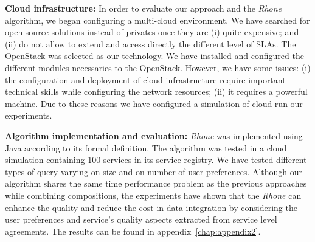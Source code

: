\bigskip
\noindent \textbf{Cloud infrastructure:}
In order to evaluate our approach and the \textit{Rhone} algorithm, we began configuring a multi-cloud environment. We have searched for open source solutions instead of privates once they are (i) quite expensive; and (ii) do not allow to extend and access directly the different level of SLAs. The OpenStack was selected as our technology. We have installed and configured the different modules necessaries to the OpenStack. However, we have some issues: (i) the configuration and deployment of cloud infrastructure require important technical skills while configuring the network resources; (ii) it requires a powerful machine. Due to these reasons we have configured a simulation of cloud run our experiments.


\bigskip
\noindent \textbf{Algorithm implementation and evaluation:}
\textit{Rhone} was implemented using Java according to its formal definition. The algorithm was tested in a cloud simulation containing 100 services in its service registry. We have tested different types of query varying on size and on number of user preferences. Although our algorithm shares the same time performance problem as the previous approaches while combining compositions, the experiments have shown that the \textit{Rhone} can enhance the quality and reduce the cost in data integration by considering the user preferences and service's quality aspects extracted from service level agreements.
The results can be found in appendix~\ref{chap:appendix2}.
 



